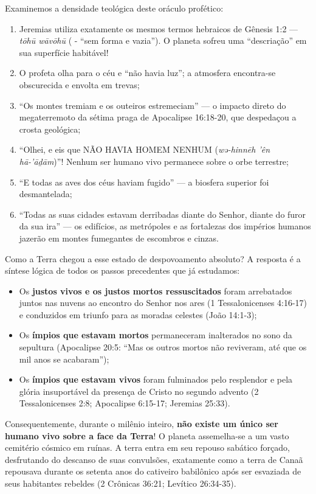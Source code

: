 \documentclass[11pt,a4paper,openany]{book}
\begin{document}
Examinemos a densidade teológica deste oráculo profético:
\begin{enumerate}
  \item Jeremias utiliza exatamente os mesmos termos hebraicos de Gênesis 1:2 — \textit{tōhū wāvōhū} ( - ``sem forma e vazia''). O planeta sofreu uma ``descriação'' em sua superfície habitável!
  \item O profeta olha para o céu e ``não havia luz''; a atmosfera encontra-se obscurecida e envolta em trevas;
  \item ``Os montes tremiam e os outeiros estremeciam'' — o impacto direto do megaterremoto da sétima praga de Apocalipse 16:18-20, que despedaçou a crosta geológica;
  \item ``Olhei, e eis que NÃO HAVIA HOMEM NENHUM (\textit{wə-hinnēh ’ên hā-’āḏām})''! Nenhum ser humano vivo permanece sobre o orbe terrestre;
  \item ``E todas as aves dos céus haviam fugido'' — a biosfera superior foi desmantelada;
  \item ``Todas as suas cidades estavam derribadas diante do Senhor, diante do furor da sua ira'' — os edifícios, as metrópoles e as fortalezas dos impérios humanos jazerão em montes fumegantes de escombros e cinzas.
\end{enumerate}


Como a Terra chegou a esse estado de despovoamento absoluto?
A resposta é a síntese lógica de todos os passos precedentes que já estudamos:
\begin{itemize}
  \item Os \textbf{justos vivos e os justos mortos ressuscitados} foram arrebatados juntos nas nuvens ao encontro do Senhor nos ares (1 Tessalonicenses 4:16-17) e conduzidos em triunfo para as moradas celestes (João 14:1-3);
  \item Os \textbf{ímpios que estavam mortos} permaneceram inalterados no sono da sepultura (Apocalipse 20:5: ``Mas os outros mortos não reviveram, até que os mil anos se acabaram'');
  \item Os \textbf{ímpios que estavam vivos} foram fulminados pelo resplendor e pela glória insuportável da presença de Cristo no segundo advento (2 Tessalonicenses 2:8; Apocalipse 6:15-17; Jeremias 25:33).
\end{itemize}


Consequentemente, durante o milênio inteiro, \textbf{não existe um único ser humano vivo sobre a face da Terra}! O planeta assemelha-se a um vasto cemitério cósmico em ruínas. A terra entra em seu repouso sabático forçado, desfrutando do descanso de suas convulsões, exatamente como a terra de Canaã repousava durante os setenta anos do cativeiro babilônico após ser esvaziada de seus habitantes rebeldes (2 Crônicas 36:21; Levítico 26:34-35).
\end{document}
